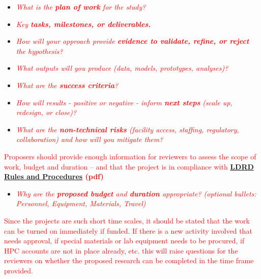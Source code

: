 \begin{itemize}[noitemsep,nolistsep]
    \item \textcolor{red}{\textit{What is the \textbf{plan of work} for the study?}}
    \item \textcolor{red}{\textit{Key \textbf{{tasks, milestones, or deliverables.}}}}
    \item \textcolor{red}{\textit{How will your approach provide \textbf{evidence to validate, refine, or reject} the hypothesis?}}
    \item \textcolor{red}{\textit{What outputs will you produce (data, models, prototypes, analyses)?}}
    \item \textcolor{red}{\textit{What are the \textbf{success criteria}?}}
    \item \textcolor{red}{\textit{How will results - positive or negative - inform \textbf{next steps} (scale up, redesign, or close)?}}
    \item \textcolor{red}{\textit{What are the \textbf{non-technical risks} (facility access, staffing, regulatory, collaboration) and how will you mitigate them?}}
\end{itemize}
\vspace*{\baselineskip}

\textcolor{red}{Proposers should provide enough information for reviewers to assess the scope of work, budget and duration – and that the project is in compliance with \textbf{\href{https://ldrd.lanl.gov/q/public/policy?inline=true}{LDRD Rules and Procedures} (pdf)}}

\begin{itemize}[noitemsep,nolistsep]
    \item \textcolor{red}{\textit{Why are the \textbf{proposed budget} and \textbf{duration} appropriate? (optional bullets: Personnel, Equipment, Materials, Travel)}}
\end{itemize}
\vspace*{\baselineskip}

\textcolor{red}{Since the projects are such short time scales, it should be stated that the work can be turned on immediately if funded. If there is a new activity involved that needs approval, if special materials or lab equipment needs to be procured, if HPC accounts are not in place already, etc. this will raise questions for the reviewers on whether the proposed research can be completed in the time frame provided.}
\vspace*{\baselineskip}

